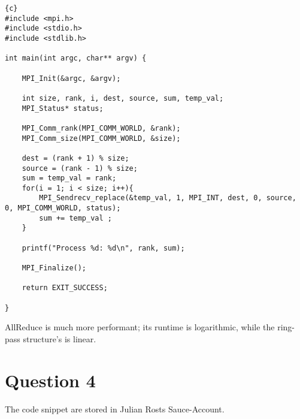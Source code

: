 \documentclass[10pt,a4paper]{scrartcl}
\begin{document}
\begin{lstlisting}{c}
#include <mpi.h>
#include <stdio.h>
#include <stdlib.h>

int main(int argc, char** argv) {

    MPI_Init(&argc, &argv);

    int size, rank, i, dest, source, sum, temp_val;
    MPI_Status* status;

    MPI_Comm_rank(MPI_COMM_WORLD, &rank);
    MPI_Comm_size(MPI_COMM_WORLD, &size);

    dest = (rank + 1) % size;
    source = (rank - 1) % size;
    sum = temp_val = rank;
    for(i = 1; i < size; i++){
        MPI_Sendrecv_replace(&temp_val, 1, MPI_INT, dest, 0, source, 0, MPI_COMM_WORLD, status);
        sum += temp_val ;
    }

    printf("Process %d: %d\n", rank, sum);

    MPI_Finalize();

    return EXIT_SUCCESS;

}

\end{lstlisting}

AllReduce is much more performant; its runtime is logarithmic, while the ring-pass structure's is linear.

\section{Question 4}

The code snippet are stored in Julian Rosts Sauce-Account.
\end{document}
